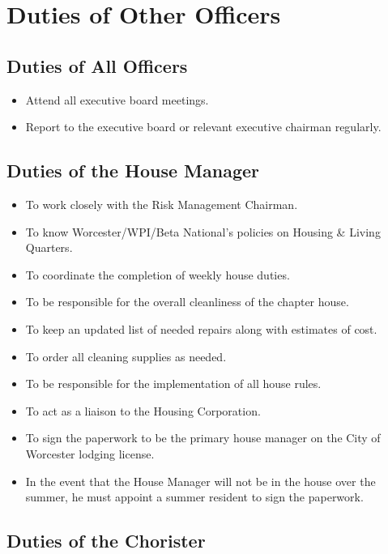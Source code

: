 \chapter{Duties of Other Officers}
\label{app:duties-of-other-officers}

\section{Duties of All Officers}
\label{sec:duties-of-all-officers}

\begin{itemize}
\item Attend all executive board meetings.
\item Report to the executive board or relevant executive chairman regularly.
\end{itemize}

\section{Duties of the House Manager}
\label{sec:duties-of-the-house-manager}

\begin{itemize}

\item To work closely with the Risk Management Chairman.
\item To know Worcester/WPI/Beta National’s policies on Housing \& Living Quarters.
\item To coordinate the completion of weekly house duties.
\item To be responsible for the overall cleanliness of the chapter house.
\item To keep an updated list of needed repairs along with estimates of cost.
\item To order all cleaning supplies as needed.
\item To be responsible for the implementation of all house rules.
\item To act as a liaison to the Housing Corporation.
\item To sign the paperwork to be the primary house manager on the City of Worcester lodging license.
\item In the event that the House Manager will not be in the house over the summer, he must appoint a summer resident to sign the paperwork.
\end{itemize}


\section{Duties of the Chorister}
\label{sec:duties-of-the-chorister}

